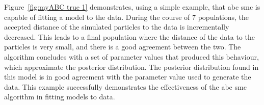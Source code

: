 Figure~\ref{fig:myABC true 1} demonstrates, using a simple example, that \acrshort{abc} \acrshort{smc} is capable of fitting a model to the data. During the course of 7 populations, the accepted distance \textepsilon{} of the simulated particles to the data is incrementally decreased. This leads to a final population where the distance of the data to the particles is very small, and there is a good agreement between the two. The algorithm concludes with a set of parameter values that produced this behaviour, which approximate the posterior distribution. The posterior distribution found in this model is in good agreement with the parameter value used to generate the data. This example successfully demonstrates the effectiveness of the \acrshort{abc} \acrshort{smc} algorithm in fitting models to data. 













